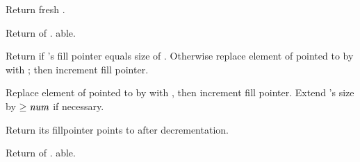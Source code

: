 \begin{LIST}{1cm}
  
  {
  Return fresh .
  }

  {
  Return  of . able.
  }

  {
  Return \retval{\NIL} if 's fill pointer equals size of
  . Otherwise replace element of  pointed to
  by  with ; then increment fill
  pointer. 
  }

  {
  Replace element of  pointed to by  with
  , then increment fill pointer. Extend 's size by
  $\ge \VAR{num}$ if necessary.
  }

  {
  Return  its fillpointer points to
  after decrementation.
  }

  {
  Return  of . able.
  }

\end{LIST}



